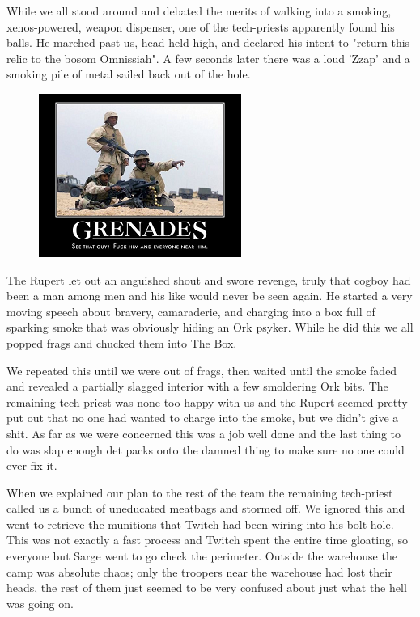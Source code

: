 While we all stood around and debated the merits of walking into a smoking, xenos-powered, weapon dispenser, one of the tech-priests apparently found his balls.
He marched past us, head held high, and declared his intent to "return this relic to the bosom Omnissiah". 
A few seconds later there was a loud 'Zzap' and a smoking pile of metal sailed back out of the hole.

\begin{figure}
	\begin{center}
		\includegraphics[width=\figwidth]{pics/4/28.png}
	\end{center}
\end{figure}
The Rupert let out an anguished shout and swore revenge, truly that cogboy had been a man among men and his like would never be seen again. 
He started a very moving speech about bravery, camaraderie, and charging into a box full of sparking smoke that was obviously hiding an Ork psyker.
While he did this we all popped frags and chucked them into The Box. 

We repeated this until we were out of frags, then waited until the smoke faded and revealed a partially slagged interior with a few smoldering Ork bits. 
The remaining tech-priest was none too happy with us and the Rupert seemed pretty put out that no one had wanted to charge into the smoke, but we didn't give a shit.
As far as we were concerned this was a job well done and the last thing to do was slap enough det packs onto the damned thing to make sure no one could ever fix it.

When we explained our plan to the rest of the team the remaining tech-priest called us a bunch of uneducated meatbags and stormed off. 
We ignored this and went to retrieve the munitions that Twitch had been wiring into his bolt-hole. 
This was not exactly a fast process and Twitch spent the entire time gloating, so everyone but Sarge went to go check the perimeter. 
Outside the warehouse the camp was absolute chaos; 
only the troopers near the warehouse had lost their heads, the rest of them just seemed to be very confused about just what the hell was going on.

